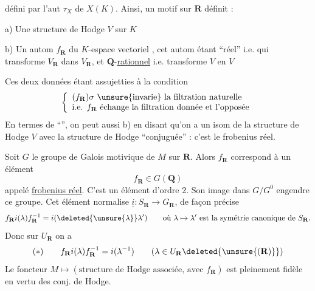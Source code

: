 défini par l'aut  $\tau_X$ de $X(K)$. Ainsi, un motif sur $\mathbf R$ définit :

a) Une structure de Hodge $V$ sur $K$

b) Un autom $f_{\mathbf R}$  du $K$-espace vectoriel  , cet autom étant ``réel'' i.e. qui transforme $V_{\mathbf R}$ dans $V_{\mathbf R}$, et $\mathbf Q$-\uline{rationnel} i.e. transforme $V$ en $V$


Ces deux données étant assujetties à la condition
\[
\left\{\begin{array}{l}
(f_{\mathbf R})\sigma\ \text{\unsure{invarie} la filtration naturelle}\\
\text{i.e. }f_{\mathbf R}\ \text{échange la filtration donnée et l'opposée}
\end{array}\right.
\]
En termes de ``'', on peut   aussi b) en disant qu'on a un isom de la structure de Hodge $V$ avec la structure de Hodge  ``conjuguée'' : c'est le frobenius réel.

Soit $G$ le groupe de Galois motivique de $M$ sur $\mathbf R$. Alors $f_{\mathbf R}$ correspond à un élément
\[
f_{\mathbf R}\in G(\mathbf Q)
\]
appelé \uline{frobenius réel}. C'est un élément d'ordre 2. Son image dans $G/G^0$ engendre ce groupe. Cet élément normalise $\underline i:S_{\mathbf R}\longrightarrow G_{\mathbf R}$, de façon précise
\[
f_{\mathbf R}i(\lambda)f_{\mathbf R}^{-1}=i(\deleted{\unsure{\lambda}}\lambda')
\qquad\text{où }\lambda\mapsto\lambda'\text{ est la symétrie canonique de }S_{\mathbf R}.
\]
Donc sur $U_{\mathbf R}$ on a
\[
(*)\qquad f_{\mathbf R}i(\lambda)f_{\mathbf R}^{-1}=i(\lambda^{-1})
\qquad (\lambda\in U_{\mathbf R}\deleted{\unsure{(\mathbf R)}})
\]
Le foncteur $M\mapsto(\text{structure de Hodge associée, avec }f_{\mathbf R})$ est pleinement fidèle en vertu des conj. de Hodge.

